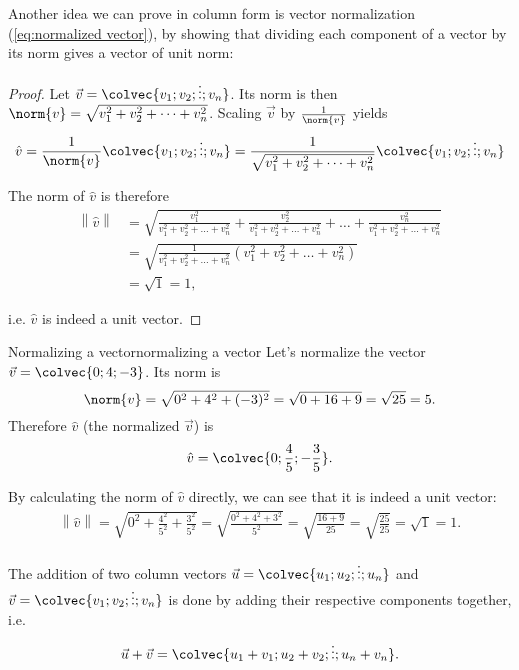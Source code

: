 Another idea we can prove in column form is vector normalization (\autoref{eq:normalized vector}), by showing that dividing each component of a vector by its norm gives a vector of unit norm:
\begin{proof}
	Let $\vec{v}=\colvec{v_{1};v_{2};\vdots;v_{n}}$. Its norm is then $\norm{v}=\sqrt{v_{1}^{2}+v_{2}^{2}+\dots+v_{n}^{2}}$. Scaling $\vec{v}$ by $\frac{1}{\norm{v}}$ yields
	\begin{equation*}
		\hat{v} = \frac{1}{\norm{v}}\colvec{v_{1};v_{2};\vdots;v_{n}} = \frac{1}{\sqrt{v_{1}^{2}+v_{2}^{2}+\dots+v_{n}^{2}}}\colvec{v_{1};v_{2};\vdots;v_{n}}
	\end{equation*}

	The norm of $\hat{v}$ is therefore
	\begin{align*}
		\left\| \hat{v} \right\| &= \sqrt{\frac{v_{1}^{2}}{v_{1}^{2}+v_{2}^{2}+\dots+v_{n}^{2}} + \frac{v_{2}^{2}}{v_{1}^{2}+v_{2}^{2}+\dots+v_{n}^{2}} + \dots + \frac{v_{n}^{2}}{v_{1}^{2}+v_{2}^{2}+\dots+v_{n}^{2}}}\\
		&= \sqrt{\frac{1}{v_{1}^{2}+v_{2}^{2}+\dots+v_{n}^{2}}\left(v_{1}^{2}+v_{2}^{2}+\dots+v_{n}^{2} \right)}\\
		&= \sqrt{1} = 1,
	\end{align*}

	i.e. $\hat{v}$ is indeed a unit vector.
\end{proof}

\begin{example}{Normalizing a vector}{normalizing a vector}
	Let's normalize the vector $\vec{v}=\colvec{0;4;-3}$. Its norm is
	\[
		\norm{v} = \sqrt{0^{2}+4^{2}+(-3)^{2}} = \sqrt{0+16+9} = \sqrt{25} = 5.
	\]
	Therefore $\hat{v}$ (the normalized $\vec{v}$) is
	\[
		\hat{v} = \colvec{0;\frac{4}{5};-\frac{3}{5}}.
	\]

	By calculating the norm of $\hat{v}$ directly, we can see that it is indeed a unit vector:
	\begin{align*}
		\left\|\hat{v}\right\| = \sqrt{0^{2} + \frac{4^{2}}{5^{2}} + \frac{3^{2}}{5^{2}}} = \sqrt{\frac{0^{2}+4^{2}+3^{2}}{5^{2}}} = \sqrt{\frac{16+9}{25}} = \sqrt{\frac{25}{25}} = \sqrt{1} = 1.
	\end{align*}
\end{example}

The addition of two column vectors $\vec{u}=\colvec{u_{1};u_{2};\vdots;u_{n}}$ and $\vec{v}=\colvec{v_{1};v_{2};\vdots;v_{n}}$ is done by adding their respective components together, i.e.
\begin{equation}
	\vec{u} + \vec{v} = \colvec{u_{1}+v_{1};u_{2}+v_{2};\vdots;u_{n}+v_{n}}.
	\label{eq:adding vectors}
\end{equation}


